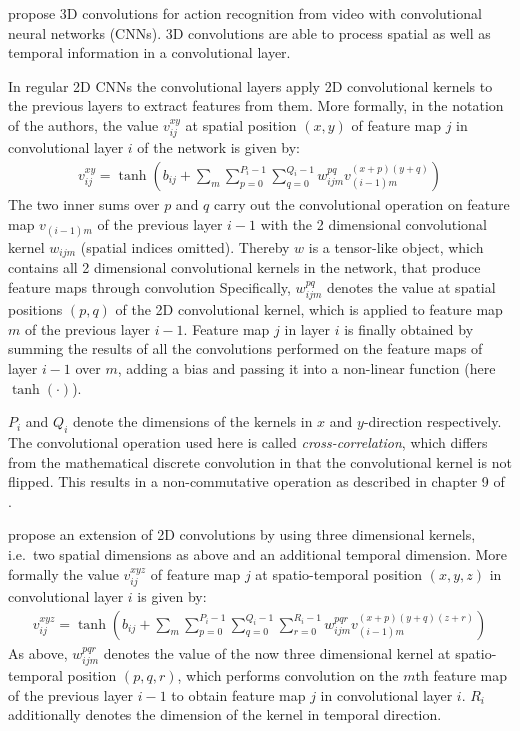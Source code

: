 \textcite{ji_3d_2013} propose 3D convolutions for action recognition from video with convolutional neural networks (CNNs).
3D convolutions are able to process spatial as well as temporal information in a convolutional layer.

In regular 2D CNNs the convolutional layers apply 2D convolutional kernels to the previous layers to extract features from them.
More formally, in the notation of the authors, the value $v_{ij}^{xy}$ at spatial position $(x,y)$ of feature map $j$ in convolutional layer $i$ of the network is given by:
\begin{align*}
    v_{ij}^{xy} = \tanh \left( b_{ij} + \sum_m \sum_{p=0}^{P_i -1} \sum_{q = 0}^{Q_i - 1} w_{ijm}^{pq} v_{(i-1)m}^{(x+p)(y+q)} \right)
\end{align*}
The two inner sums over $p$ and $q$ carry out the convolutional operation on feature map $v_{(i-1)m}$ of the previous layer $i-1$ with the 2 dimensional convolutional kernel $w_{ijm}$ (spatial indices omitted).
Thereby $w$ is a tensor-like object, which contains all 2 dimensional convolutional kernels in the network, that produce feature maps through convolution
Specifically, $w_{ijm}^{pq}$ denotes the value at spatial positions $(p,q)$ of the 2D convolutional kernel, which is applied to feature map $m$ of the previous layer $i-1$.
Feature map $j$ in layer $i$ is finally obtained by summing the results of all the convolutions performed on the feature maps of layer $i-1$ over $m$, adding a bias and passing it into a non-linear function (here $\tanh(\cdot)$).

$P_i$ and $Q_i$ denote the dimensions of the kernels in $x$ and $y$-direction respectively.
The convolutional operation used here is called \textit{cross-correlation}, which differs from the mathematical discrete convolution in that the convolutional kernel is not flipped. This results in a non-commutative operation as described in chapter 9 of \cite{goodfellow_deep_2016}.

\textcite{ji_3d_2013} propose an extension of 2D convolutions by using three dimensional kernels, i.e.\ two spatial dimensions as above and an additional temporal dimension.
More formally the value $v_{ij}^{xyz}$ of feature map $j$ at spatio-temporal position $(x,y,z)$ in convolutional layer $i$ is given by:
\begin{align*}
    v_{ij}^{xyz} = \tanh \left( b_{ij} + \sum_m \sum_{p=0}^{P_i -1} \sum_{q = 0}^{Q_i - 1} \sum_{r = 0}^{R_i - 1} w_{ijm}^{pqr} v_{(i-1)m}^{(x+p)(y+q)(z+r)} \right)
\end{align*}
As above, $w_{ijm}^{pqr}$ denotes the value of the now three dimensional kernel at spatio-temporal position $(p,q,r)$, which performs convolution on the $m$th feature map of the previous layer $i-1$ to obtain feature map $j$ in convolutional layer $i$.
$R_i$ additionally denotes the dimension of the kernel in temporal direction. 

